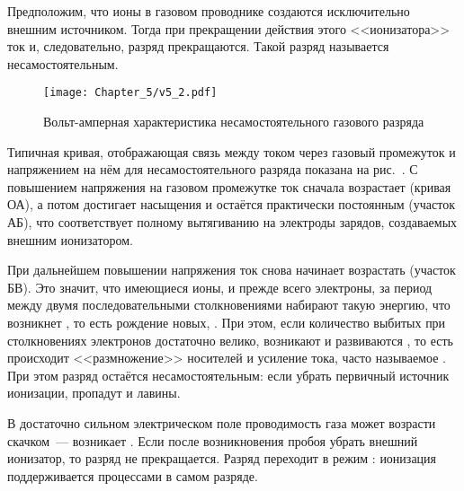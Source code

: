 Предположим, что ионы в газовом проводнике создаются исключительно внешним
источником. Тогда при прекращении действия этого <<ионизатора>> ток и,
следовательно, разряд прекращаются. Такой разряд называется несамостоятельным.

\begin{figure}[h!]
	\centering
	\texttt{[image: Chapter\_5/v5\_2.pdf]}
	\caption{Вольт-амперная характеристика несамостоятельного газового разряда}
\end{figure}

Типичная кривая, отображающая связь между током через газовый промежуток и
напряжением на нём для несамостоятельного разряда показана на
рис.~. С повышением напряжения
на газовом промежутке ток сначала возрастает (кривая ОА), а потом достигает
насыщения и остаётся практически постоянным (участок АБ), что соответствует
полному вытягиванию на электроды зарядов, создаваемых внешним ионизатором.

При дальнейшем повышении напряжения ток снова начинает возрастать (участок БВ).
Это значит, что имеющиеся ионы, и прежде всего электроны, за период между двумя
последовательными столкновениями набирают такую энергию, что возникнет
, то есть рождение новых,
. При этом,
если количество выбитых при столкновениях электронов достаточно велико,
возникают и развиваются ,
то есть происходит <<размножение>> носителей и усиление тока,
часто называемое .
При этом разряд остаётся несамостоятельным: если убрать первичный источник
ионизации, пропадут и лавины.

В достаточно сильном электрическом поле проводимость газа может возрасти
скачком~--- возникает .
Если после возникновения пробоя убрать внешний ионизатор, то разряд не
прекращается. Разряд переходит в режим :
ионизация поддерживается процессами в самом разряде.

